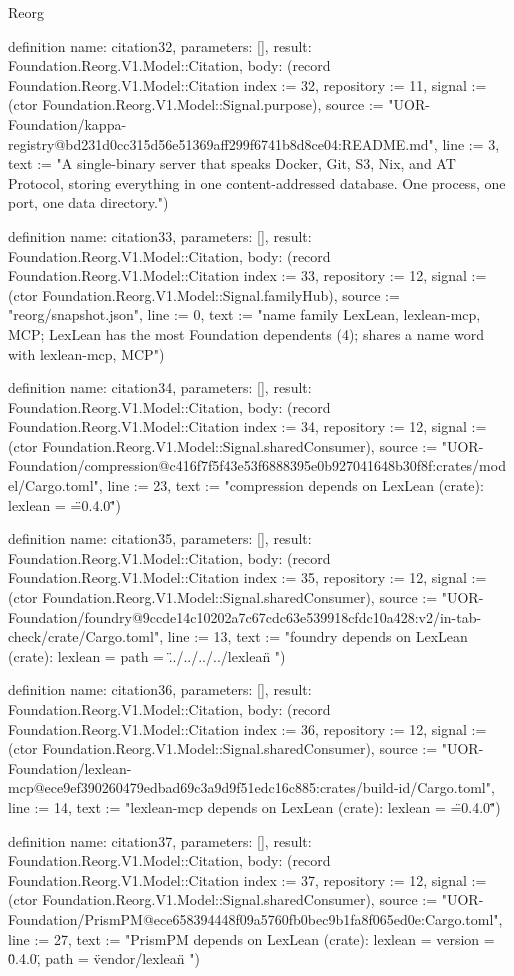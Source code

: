 \begin{lexlean}{Reorg}
\begin{semanticmodule}
definition{
  name: citation32,
  parameters: [],
  result: Foundation.Reorg.V1.Model::Citation,
  body: (record Foundation.Reorg.V1.Model::Citation {index := 32, repository := 11, signal := (ctor Foundation.Reorg.V1.Model::Signal.purpose), source := "UOR-Foundation/kappa-registry@bd231d0cc315d56e51369aff299f6741b8d8ce04:README.md", line := 3, text := "A single-binary server that speaks Docker, Git, S3, Nix, and AT Protocol, storing everything in one content-addressed database. One process, one port, one data directory."})
}

definition{
  name: citation33,
  parameters: [],
  result: Foundation.Reorg.V1.Model::Citation,
  body: (record Foundation.Reorg.V1.Model::Citation {index := 33, repository := 12, signal := (ctor Foundation.Reorg.V1.Model::Signal.familyHub), source := "reorg/snapshot.json", line := 0, text := "name family {LexLean, lexlean-mcp, MCP}; LexLean has the most Foundation dependents (4); shares a name word with lexlean-mcp, MCP"})
}

definition{
  name: citation34,
  parameters: [],
  result: Foundation.Reorg.V1.Model::Citation,
  body: (record Foundation.Reorg.V1.Model::Citation {index := 34, repository := 12, signal := (ctor Foundation.Reorg.V1.Model::Signal.sharedConsumer), source := "UOR-Foundation/compression@c416f7f5f43e53f6888395e0b927041648b30f8f:crates/model/Cargo.toml", line := 23, text := "compression depends on LexLean (crate): lexlean = \"=0.4.0\""})
}

definition{
  name: citation35,
  parameters: [],
  result: Foundation.Reorg.V1.Model::Citation,
  body: (record Foundation.Reorg.V1.Model::Citation {index := 35, repository := 12, signal := (ctor Foundation.Reorg.V1.Model::Signal.sharedConsumer), source := "UOR-Foundation/foundry@9ccde14c10202a7c67cdc63e539918cfdc10a428:v2/in-tab-check/crate/Cargo.toml", line := 13, text := "foundry depends on LexLean (crate): lexlean = { path = \"../../../../lexlean\" }"})
}

definition{
  name: citation36,
  parameters: [],
  result: Foundation.Reorg.V1.Model::Citation,
  body: (record Foundation.Reorg.V1.Model::Citation {index := 36, repository := 12, signal := (ctor Foundation.Reorg.V1.Model::Signal.sharedConsumer), source := "UOR-Foundation/lexlean-mcp@ece9ef390260479edbad69c3a9d9f51edc16c885:crates/build-id/Cargo.toml", line := 14, text := "lexlean-mcp depends on LexLean (crate): lexlean = \"=0.4.0\""})
}

definition{
  name: citation37,
  parameters: [],
  result: Foundation.Reorg.V1.Model::Citation,
  body: (record Foundation.Reorg.V1.Model::Citation {index := 37, repository := 12, signal := (ctor Foundation.Reorg.V1.Model::Signal.sharedConsumer), source := "UOR-Foundation/PrismPM@ece658394448f09a5760fb0bec9b1fa8f065ed0e:Cargo.toml", line := 27, text := "PrismPM depends on LexLean (crate): lexlean = { version = \"0.4.0\", path = \"vendor/lexlean\" }"})
}


\end{semanticmodule}
\end{lexlean}
